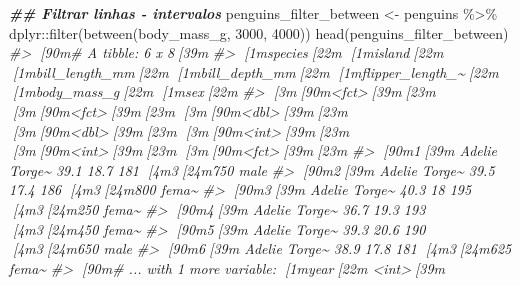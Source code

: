\documentclass[
]{book}
\newenvironment{Shaded}{\begin{snugshade}}{\end{snugshade}}
\newcommand{\CommentTok}[1]{\textcolor[rgb]{0.37,0.37,0.37}{\textit{#1}}}
\newcommand{\DecValTok}[1]{\textcolor[rgb]{0.06,0.06,0.06}{#1}}
\newcommand{\DocumentationTok}[1]{\textcolor[rgb]{0.37,0.37,0.37}{\textbf{\textit{#1}}}}
\newcommand{\FunctionTok}[1]{\textcolor[rgb]{0,0,0}{#1}}
\newcommand{\NormalTok}[1]{#1}
\newcommand{\OtherTok}[1]{\textcolor[rgb]{0.37,0.37,0.37}{#1}}
\newcommand{\SpecialCharTok}[1]{\textcolor[rgb]{0,0,0}{#1}}
\begin{document}
\begin{Shaded}
\begin{Highlighting}[]
\DocumentationTok{\#\# Filtrar linhas {-} intervalos}
\NormalTok{penguins\_filter\_between }\OtherTok{\textless{}{-}}\NormalTok{ penguins }\SpecialCharTok{\%\textgreater{}\%} 
\NormalTok{  dplyr}\SpecialCharTok{::}\FunctionTok{filter}\NormalTok{(}\FunctionTok{between}\NormalTok{(body\_mass\_g, }\DecValTok{3000}\NormalTok{, }\DecValTok{4000}\NormalTok{))}
\FunctionTok{head}\NormalTok{(penguins\_filter\_between)}
\CommentTok{\#\textgreater{} [90m\# A tibble: 6 x 8[39m}
\CommentTok{\#\textgreater{}   [1mspecies[22m [1misland[22m [1mbill\_length\_mm[22m [1mbill\_depth\_mm[22m [1mflipper\_length\_\textasciitilde{}[22m [1mbody\_mass\_g[22m [1msex[22m  }
\CommentTok{\#\textgreater{}   [3m[90m\textless{}fct\textgreater{}[39m[23m   [3m[90m\textless{}fct\textgreater{}[39m[23m           [3m[90m\textless{}dbl\textgreater{}[39m[23m         [3m[90m\textless{}dbl\textgreater{}[39m[23m            [3m[90m\textless{}int\textgreater{}[39m[23m       [3m[90m\textless{}int\textgreater{}[39m[23m [3m[90m\textless{}fct\textgreater{}[39m[23m}
\CommentTok{\#\textgreater{} [90m1[39m Adelie  Torge\textasciitilde{}           39.1          18.7              181        [4m3[24m750 male }
\CommentTok{\#\textgreater{} [90m2[39m Adelie  Torge\textasciitilde{}           39.5          17.4              186        [4m3[24m800 fema\textasciitilde{}}
\CommentTok{\#\textgreater{} [90m3[39m Adelie  Torge\textasciitilde{}           40.3          18                195        [4m3[24m250 fema\textasciitilde{}}
\CommentTok{\#\textgreater{} [90m4[39m Adelie  Torge\textasciitilde{}           36.7          19.3              193        [4m3[24m450 fema\textasciitilde{}}
\CommentTok{\#\textgreater{} [90m5[39m Adelie  Torge\textasciitilde{}           39.3          20.6              190        [4m3[24m650 male }
\CommentTok{\#\textgreater{} [90m6[39m Adelie  Torge\textasciitilde{}           38.9          17.8              181        [4m3[24m625 fema\textasciitilde{}}
\CommentTok{\#\textgreater{} [90m\# ... with 1 more variable: [1myear[22m \textless{}int\textgreater{}[39m}


\end{Highlighting}
\end{Shaded}
\end{document}
